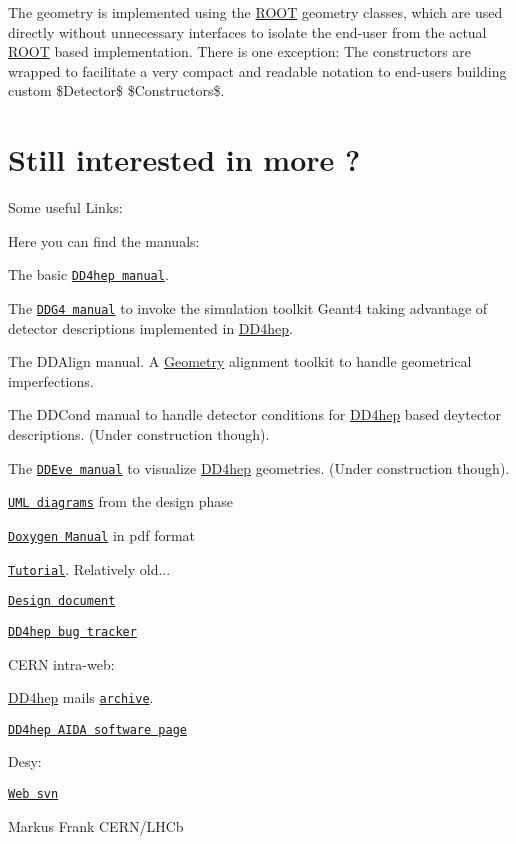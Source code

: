 The geometry is implemented using the \hyperlink{namespace_r_o_o_t}{R\+O\+OT} geometry classes, which are used directly without unnecessary interfaces to isolate the end-\/user from the actual \hyperlink{namespace_r_o_o_t}{R\+O\+OT} based implementation. There is one exception\+: The constructors are wrapped to facilitate a very compact and readable notation to end-\/users building custom \$\+Detector\$ \$\+Constructors\$.\hypertarget{index_MORE_INFO}{}\section{Still interested in more ?}\label{index_MORE_INFO}
\label{_UsefulLinks}%
Some useful Links\+:

Here you can find the manuals\+:


\begin{DoxyItemize}
\item The basic \href{../DD4hepManual.pdf}{\tt D\+D4hep manual}.
\item The \href{../DDG4Manual.pdf}{\tt D\+D\+G4 manual} to invoke the simulation toolkit Geant4 taking advantage of detector descriptions implemented in \hyperlink{namespace_d_d4hep}{D\+D4hep}.
\item The D\+D\+Align manual. A \hyperlink{namespace_geometry}{Geometry} alignment toolkit to handle geometrical imperfections.
\item The D\+D\+Cond manual to handle detector conditions for \hyperlink{namespace_d_d4hep}{D\+D4hep} based deytector descriptions. (Under construction though).
\item The \href{../DDEveManual.pdf}{\tt D\+D\+Eve manual} to visualize \hyperlink{namespace_d_d4hep}{D\+D4hep} geometries. (Under construction though).
\item \href{../DD4hep_Diagrams.pdf}{\tt U\+ML diagrams} from the design phase
\item \href{../refman.pdf}{\tt Doxygen Manual} in pdf format
\item \href{../DD4hep_Tutorial.pdf}{\tt Tutorial}. Relatively old...
\item \href{http://cds.cern.ch/record/1473120/files/AIDA-D2_3.pdf}{\tt Design document}
\item \href{https://sft.its.cern.ch/jira/browse/DDFORHEP}{\tt D\+D4hep bug tracker}
\end{DoxyItemize}C\+E\+RN intra-\/web\+:
\begin{DoxyItemize}
\item \hyperlink{namespace_d_d4hep}{D\+D4hep} mails \href{https://groups.cern.ch/group/dd4hep-developers/Lists/Archive/100.aspx}{\tt archive}.
\item \href{http://aidasoft.web.cern.ch/DD4hep}{\tt D\+D4hep A\+I\+DA software page}
\end{DoxyItemize}Desy\+:
\begin{DoxyItemize}
\item \href{https://svnsrv.desy.de/websvn/wsvn/General.aidasoft/DD4hep}{\tt Web svn}
\end{DoxyItemize}Markus Frank C\+E\+R\+N/\+L\+H\+Cb 